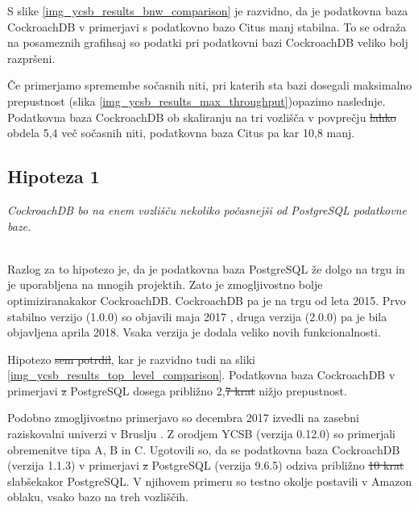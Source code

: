 \documentclass[a4paper, 12pt]{book}
\providecommand{\DIFaddtex}[1]{{\protect\color{blue}\uwave{#1}}} %
\providecommand{\DIFdeltex}[1]{{\protect\color{red}\sout{#1}}}                      %
\providecommand{\DIFaddbegin}{} %
\providecommand{\DIFaddend}{} %
\providecommand{\DIFdelbegin}{} %
\providecommand{\DIFdelend}{} %
\providecommand{\DIFadd}[1]{\texorpdfstring{\DIFaddtex{#1}}{#1}} %
\providecommand{\DIFdel}[1]{\texorpdfstring{\DIFdeltex{#1}}{}} %
\newcommand{\DIFscaledelfig}{0.5}
\newlength{\DIFdelgraphicswidth} %
\newlength{\DIFdelgraphicsheight} %
\newcommand{\DIFaddincludegraphics}[2][]{{\color{blue}\fbox{\DIFOincludegraphics[#1]{#2}}}} %
\newcommand{\DIFdelincludegraphics}[2][]{%
\sbox{\DIFdelgraphicsbox}{\DIFOincludegraphics[#1]{#2}}%
\settoboxwidth{\DIFdelgraphicswidth}{\DIFdelgraphicsbox} %
\settoboxtotalheight{\DIFdelgraphicsheight}{\DIFdelgraphicsbox} %
\scalebox{\DIFscaledelfig}{%
\parbox[b]{\DIFdelgraphicswidth}{\usebox{\DIFdelgraphicsbox}\\[-\baselineskip] \rule{\DIFdelgraphicswidth}{0em}}\llap{\resizebox{\DIFdelgraphicswidth}{\DIFdelgraphicsheight}{%
\setlength{\unitlength}{\DIFdelgraphicswidth}%
\begin{picture}(1,1)%
\thicklines\linethickness{2pt} %
{\color[rgb]{1,0,0}\put(0,0){\framebox(1,1){}}}%
{\color[rgb]{1,0,0}\put(0,0){\line( 1,1){1}}}%
{\color[rgb]{1,0,0}\put(0,1){\line(1,-1){1}}}%
\end{picture}%
}\hspace*{3pt}}} %
} %
\DeclareRobustCommand{\DIFaddbegin}{\DIFOaddbegin \let\includegraphics\DIFaddincludegraphics} %
\DeclareRobustCommand{\DIFaddend}{\DIFOaddend \let\includegraphics\DIFOincludegraphics} %
\DeclareRobustCommand{\DIFdelbegin}{\DIFOdelbegin \let\includegraphics\DIFdelincludegraphics} %
\DeclareRobustCommand{\DIFdelend}{\DIFOaddend \let\includegraphics\DIFOincludegraphics} %
\begin{document}
S slike \ref{img_ycsb_results_bnw_comparison} je razvidno, da je podatkovna baza CockroachDB v primerjavi s podatkovno bazo Citus manj stabilna. To se odraža na posameznih grafih\DIFaddbegin \DIFadd{, }\DIFaddend saj so podatki pri podatkovni bazi CockroachDB veliko bolj razpršeni.

Če primerjamo spremembe sočasnih niti, pri katerih sta bazi dosegali maksimalno prepustnost (slika \ref{img_ycsb_results_max_throughput})\DIFaddbegin \DIFadd{, }\DIFaddend opazimo naslednje. Podatkovna baza CockroachDB ob skaliranju na tri vozlišča \DIFaddbegin \DIFadd{lahko }\DIFaddend v povprečju \DIFdelbegin \DIFdel{lahko }\DIFdelend obdela 5,4 več sočasnih niti, podatkovna baza Citus pa kar 10,8 manj.

\subsection{Hipoteza 1}
\textit{CockroachDB bo na enem vozlišču nekoliko počasnejši od PostgreSQL podatkovne baze.}

\ \\
Razlog za to hipotezo je, da je podatkovna baza PostgreSQL že dolgo na trgu \cite{Postgres-first-release} in je uporabljena na mnogih projektih. Zato je zmogljivostno bolje optimizirana\DIFaddbegin \DIFadd{, }\DIFaddend kakor CockroachDB. CockroachDB pa je na trgu od leta 2015. Prvo stabilno verzijo (1.0.0) so objavili maja 2017 \cite{CRDB-2017}, druga verzija (2.0.0) pa je bila objavljena aprila 2018. Vsaka verzija je dodala veliko novih funkcionalnosti.


Hipotezo \DIFdelbegin \DIFdel{sem potrdil}\DIFdelend \DIFaddbegin \DIFadd{smo potrdili}\DIFaddend , kar je razvidno tudi na sliki \ref{img_ycsb_results_top_level_comparison}. Podatkovna baza CockroachDB v primerjavi \DIFdelbegin \DIFdel{z }\DIFdelend \DIFaddbegin \DIFadd{s }\DIFaddend PostgreSQL dosega približno 2,\DIFdelbegin \DIFdel{7 krat }\DIFdelend \DIFaddbegin \DIFadd{7-krat }\DIFaddend nižjo prepustnost.

Podobno zmogljivostno primerjavo so decembra 2017 izvedli na zasebni raziskovalni univerzi v Bruslju \cite{CRDB-2017}. Z orodjem YCSB (verzija 0.12.0) so primerjali obremenitve tipa A, B in C. Ugotovili so, da se podatkovna baza CockroachDB (verzija 1.1.3) v primerjavi \DIFdelbegin \DIFdel{z }\DIFdelend \DIFaddbegin \DIFadd{s }\DIFaddend PostgreSQL (verzija 9.6.5) odziva približno \DIFdelbegin \DIFdel{10 krat }\DIFdelend \DIFaddbegin \DIFadd{10-krat }\DIFaddend slabše\DIFaddbegin \DIFadd{, }\DIFaddend kakor PostgreSQL. V njihovem primeru so testno okolje postavili v Amazon oblaku, vsako bazo na treh vozliščih.
\end{document}
